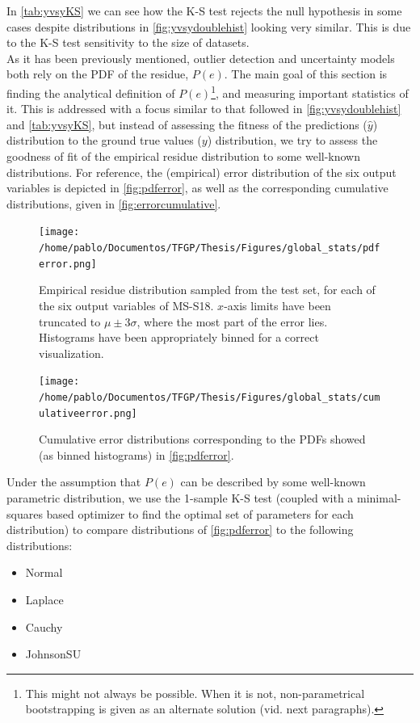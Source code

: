 %
\indent In \autoref{tab:yvsyKS} we can see how the K-S test rejects the null hypothesis in some cases despite distributions in \autoref{fig:yvsydoublehist} looking very similar. This is due to the K-S test sensitivity to the size of datasets.\\
%
\indent As it has been previously mentioned, outlier detection and uncertainty models both rely on the PDF of the residue, $P(e)$. The main goal of this section is finding the analytical definition of $P(e)$\footnote{This might not always be possible. When it is not, non-parametrical bootstrapping is given as an alternate solution (vid. next paragraphs).}, and measuring important statistics of it. This is addressed with a focus similar to that followed in \autoref{fig:yvsydoublehist} and \autoref{tab:yvsyKS}, but instead of assessing the fitness of the predictions ($\hat{y}$) distribution to the ground true values ($y$) distribution, we try to assess the goodness of fit of the empirical residue distribution to some well-known distributions. For reference, the (empirical) error distribution of the six output variables is depicted in \autoref{fig:pdferror}, as well as the corresponding cumulative distributions, given in \autoref{fig:errorcumulative}.\\
\begin{figure}
	\centering
	\texttt{[image: /home/pablo/Documentos/TFGP/Thesis/Figures/global\_stats/pdferror.png]}
	\caption{Empirical residue distribution sampled from the test set, for each of the six output variables of MS-S18. $x$-axis limits have been truncated to $\mu \pm 3 \sigma$, where the most part of the error lies. Histograms have been appropriately binned for a correct visualization.}
	\label{fig:pdferror}
\end{figure}
\begin{figure}
	\centering
	\texttt{[image: /home/pablo/Documentos/TFGP/Thesis/Figures/global\_stats/cumulativeerror.png]}
	\caption{Cumulative error distributions corresponding to the PDFs showed (as binned histograms) in \autoref{fig:pdferror}.}
	\label{fig:errorcumulative}
\end{figure}
%
\indent Under the assumption that $P(e)$ can be described by some well-known parametric distribution, we use the 1-sample K-S test (coupled with a minimal-squares based optimizer to find the optimal set of parameters for each distribution) to compare distributions of \autoref{fig:pdferror} to the following distributions:
\begin{itemize}
	\item Normal
	\item Laplace
	\item Cauchy
	\item JohnsonSU\\
\end{itemize}
